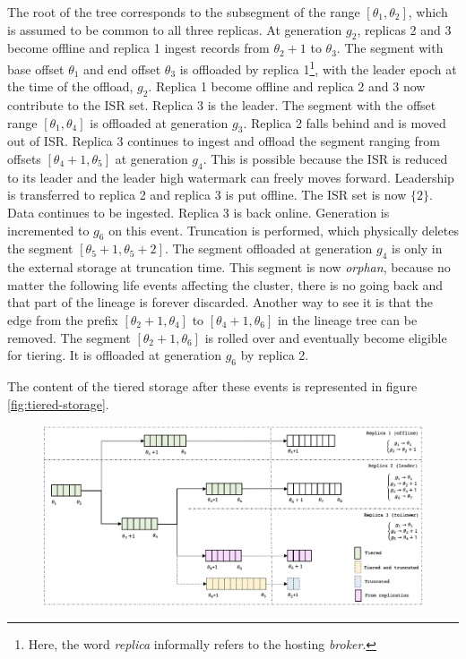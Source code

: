 \documentclass{article}
\begin{document}
\begin{outline}[enumerate]
\1 The root of the tree corresponds to the subsegment of the range $[\theta_1, \theta_2]$, which is assumed to be common to all three replicas.
\1 At generation $g_2$, replicas 2 and 3 become offline and replica 1 ingest records from $\theta_{2} + 1$ to $\theta_3$. The segment with base offset $\theta_1$ and end offset $\theta_3$ is offloaded by replica 1\footnote{Here, the word \textit{replica} informally refers to the hosting \textit{broker}.}, with the leader epoch at the time of the offload, $g_2$.
\1 Replica 1 become offline and replica 2 and 3 now contribute to the ISR set. Replica 3 is the leader. The segment with the offset range $[\theta_1, \theta_4]$ is offloaded at generation $g_3$.
\1 Replica 2 falls behind and is moved out of ISR. Replica 3 continues to ingest and offload the segment ranging from offsets $[\theta_4 + 1, \theta_5]$ at generation $g_4$. This is possible because the ISR is reduced to its leader and the leader high watermark can freely moves forward.
\1 Leadership is transferred to replica 2 and replica 3 is put offline. The ISR set is now $\{2\}$. Data continues to be ingested.
\1 Replica 3 is back online. Generation is incremented to $g_6$ on this event. Truncation is performed, which physically deletes the segment $[\theta_{5}+1, \theta_{5}+2]$. The segment offloaded at generation $g_4$ is only in the external storage at truncation time. This segment is now \textit{orphan}, because no matter the following life events affecting the cluster, there is no going back and that part of the lineage is forever discarded. Another way to see it is that the edge from the prefix $[\theta_2+1,\theta_4]$ to $[\theta_4+1,\theta_6]$ in the lineage tree can be removed.
\1 The segment $[\theta_2+1,\theta_6]$ is rolled over and eventually become eligible for tiering. It is offloaded at generation $g_6$ by replica 2.
\end{outline}

The content of the tiered storage after these events is represented in figure \ref{fig:tiered-storage}.

\begin{figure}[h!]
	\centering
	\includegraphics[scale=0.55]{lineage-tree-1.png}
	\label{fig:lineage-tree-1}
\end{figure}
\end{document}
